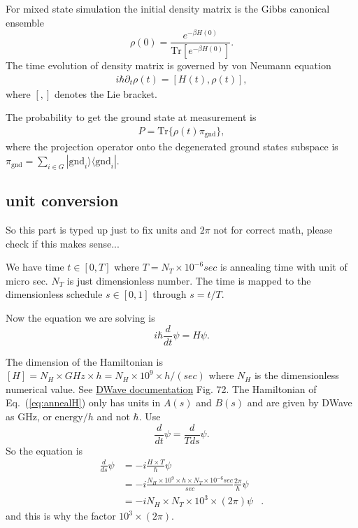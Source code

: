 \documentclass[]{article}
\begin{document}
For mixed state simulation the initial density matrix is the Gibbs canonical ensemble
\begin{equation}
\rho (0) =  \frac{e^{-\beta H(0)}}{\mbox{Tr}[e^{-\beta H(0)}]} .
\end{equation}
The time evolution of density matrix is governed by von Neumann equation
\begin{align}
i \hbar \partial_t \rho (t) = [H(t) , \rho(t)] ,
\end{align}
where $[,]$ denotes the Lie bracket.

The probability to get the ground state at measurement is
\begin{align}
P =  \mbox{Tr} \{  \rho (t) \pi_{\mbox{gnd}} \}  ,
\end{align}
where the projection operator onto the degenerated ground states subspace is $\pi_{\mbox{gnd}}=\sum_{i\in G} |\mbox{gnd}_i\rangle \langle \mbox{gnd}_i| $.

\subsection{unit conversion}

So this part is typed up just to fix units and $2\pi$ not for correct math, please check if this makes sense...


We have time $t \in [0,T]$ where $T=N_T \times 10^{-6} sec$ is annealing time with unit of micro sec. $N_T$ is just dimensionless number. The time is mapped to the dimensionless schedule $s\in [0,1]$ through $s=t/T$.

Now the equation we are solving is
\begin{equation}
 i \hbar \frac{d}{dt}\psi = H \psi .
\end{equation}

The dimension of the Hamiltonian is $[H]=N_H \times GHz \times h =N_H \times 10^9  \times h/( sec)$ where $N_H$ is the dimensionless numerical value. See 
\href{https://docs.dwavesys.com/docs/latest/c_qpu_0.html#quantum-annealing-with-ising-spins-in-a-transverse-field}{DWave documentation} Fig. 72. The Hamiltonian of Eq.~(\ref{eq:annealH}) only has units in $A(s)$ and $B(s)$ and are given by DWave as GHz, or $\mathrm{energy}/h$ and not $\hbar$.
Use
\begin{equation}
\frac{d}{dt}\psi = \frac{d}{Tds}\psi .
\end{equation}
So the equation is
\begin{align}
  \frac{d}{ds}\psi  &=  -i \frac{H\times T}{\hbar} \psi  &\\
   &=  -i \frac{N_H \times 10^9 \times h \times N_T \times 10^{-6} sec}{ sec  }\frac{2\pi}{h} \psi &  \\
  &= -i N_H \times N_T \times 10^{3} \times (2\pi) \psi  &.
\end{align}
and this is why the factor $10^{3} \times (2\pi)$.
\end{document}
